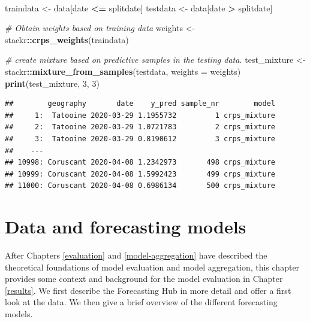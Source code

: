 \documentclass[
]{book}
\newenvironment{Shaded}{\begin{snugshade}}{\end{snugshade}}
\newcommand{\CommentTok}[1]{\textcolor[rgb]{0.56,0.35,0.01}{\textit{#1}}}
\newcommand{\DataTypeTok}[1]{\textcolor[rgb]{0.13,0.29,0.53}{#1}}
\newcommand{\DecValTok}[1]{\textcolor[rgb]{0.00,0.00,0.81}{#1}}
\newcommand{\KeywordTok}[1]{\textcolor[rgb]{0.13,0.29,0.53}{\textbf{#1}}}
\newcommand{\NormalTok}[1]{#1}
\newcommand{\OperatorTok}[1]{\textcolor[rgb]{0.81,0.36,0.00}{\textbf{#1}}}
\newcommand{\StringTok}[1]{\textcolor[rgb]{0.31,0.60,0.02}{#1}}
\begin{document}
\(~\)

\begin{Shaded}
\begin{Highlighting}[]
\NormalTok{traindata \textless{}{-}}\StringTok{ }\NormalTok{data[date }\OperatorTok{\textless{}=}\StringTok{ }\NormalTok{splitdate]}
\NormalTok{testdata \textless{}{-}}\StringTok{ }\NormalTok{data[date }\OperatorTok{\textgreater{}}\StringTok{ }\NormalTok{splitdate]}

\CommentTok{\# Obtain weights based on training data}
\NormalTok{weights \textless{}{-}}\StringTok{ }\NormalTok{stackr}\OperatorTok{::}\KeywordTok{crps\_weights}\NormalTok{(traindata)}

\CommentTok{\# create mixture based on predictive samples in the testing data. }
\NormalTok{test\_mixture \textless{}{-}}\StringTok{ }\NormalTok{stackr}\OperatorTok{::}\KeywordTok{mixture\_from\_samples}\NormalTok{(testdata, }\DataTypeTok{weights =}\NormalTok{ weights)}
\KeywordTok{print}\NormalTok{(test\_mixture, }\DecValTok{3}\NormalTok{, }\DecValTok{3}\NormalTok{)}
\end{Highlighting}
\end{Shaded}

\begin{verbatim}
##        geography       date    y_pred sample_nr        model
##     1:  Tatooine 2020-03-29 1.1955732         1 crps_mixture
##     2:  Tatooine 2020-03-29 1.0721783         2 crps_mixture
##     3:  Tatooine 2020-03-29 0.8190612         3 crps_mixture
##    ---                                                      
## 10998: Coruscant 2020-04-08 1.2342973       498 crps_mixture
## 10999: Coruscant 2020-04-08 1.5992423       499 crps_mixture
## 11000: Coruscant 2020-04-08 0.6986134       500 crps_mixture
\end{verbatim}

\hypertarget{background-data}{%
\chapter{Data and forecasting models}\label{background-data}}

After Chapters \ref{evaluation} and \ref{model-aggregation} have described the theoretical foundations of model evaluation and model aggregation, this chapter provides some context and background for the model evaluation in Chapter \ref{results}. We first describe the Forecasting Hub in more detail and offer a first look at the data. We then give a brief overview of the different forecasting models.
\end{document}

